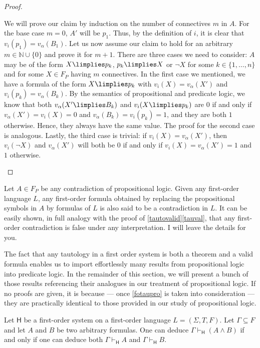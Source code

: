 \begin{proof}
\begin{parlist}
We will prove our claim by induction on the number of connectives $m$ in ${A}$. For the base case $m=0$, $A'$ will be $p_1$. Thus, by the definition of $i$, it is clear that $v_i(p_1) = v_\alpha(B_1)$. 
Let us now assume our claim to hold for an arbitrary $m\in\mathbb{N} \cup \{0\}$ and prove it for $m+1$.
There are three cases we need to consider: $A$ may be of the form $X\limplies p_k$,  $p_k \limplies X$ or $\lnot X$ for some $k \in \{1,\ldots,n\}$ and for some $X\in F_P$ having $m$ connectives.
In the first case we mentioned, we have a formula of the form $X\limplies p_k$ with $v_i(X) = v_\alpha(X')$ and $v_i(p_k) = v_\alpha(B_k)$.
By the semantics of propositional and predicate logic, we know that both $v_\alpha(X' \limplies B_k)$ and $v_i(X\limplies p_k)$ are $0$ if and only if $v_\alpha(X') = v_i(X) = 0$ and $v_\alpha(B_k) = v_i(p_k) = 1$, and they are both $1$ otherwise.
Hence, they always have the same value. The proof for the second case is analogous. Lastly, the third case is trivial: if $v_i(X) = v_\alpha(X')$, then $v_i(\lnot X)$ and $v_\alpha(X')$ will both be $0$ if and only if $v_i(X) = v_\alpha(X') = 1$ and $1$ otherwise.
\end{parlist}

\end{proof}


\begin{para}
Let $A\in F_P$ be any contradiction of propositional logic. Given any first-order language $L$, any first-order formula obtained by replacing the propositional symbols in $A$ by formulas of $L$ is also said to be a contradiction in $L$.
It can be easily shown, in full analogy with the proof of \ref{tautovalid}\ref{tauval}, that any first-order contradiction is false under any interpretation. I will leave the details for you.
\end{para}


\begin{para}
The fact that any tautology in a first order system is both a theorem and a valid formula enables us to import effortlessly many results from propositional logic into predicate logic.
In the remainder of this section, we will present a bunch of those results referencing their analogues in our treatment of propositional logic.
If no proofs are given, it is because --- once \ref{fotaupro} is taken into consideration --- they are practically identical to those provided in our study of propositional logic.
\end{para}

\begin{lemma}
Let $\mathsf{H}$ be a first-order system on a first-order language $L = (\Sigma, T, F)$. Let $\Gamma \subseteq F$ and let $A$ and $B$ be two arbitrary formulas. One can deduce $\Gamma\vdash_{\mathsf{H}} (A\land B)$ if and only if one can deduce both $\Gamma \vdash_{\mathsf{H}} A$ and $\Gamma \vdash_\mathsf{H} B$.
\label{}
\end{lemma}

